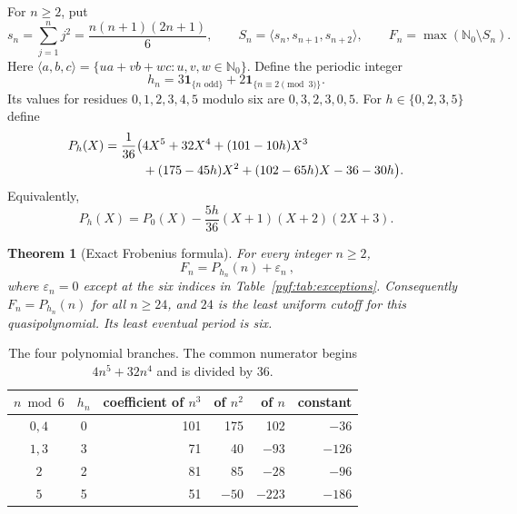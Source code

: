 \documentclass[11pt,a4paper]{article}
\numberwithin{equation}{section}
\newtheorem{theorem}{Theorem}[section]
\theoremstyle{definition}
\newcommand{\N}{\mathbb N_0}
\newcommand{\eps}{\varepsilon}
\newcommand{\ind}{\mathbf 1}
\begin{document}
For $n\geq2$, put
\begin{equation}\label{pyf:eq:defs}
s_n=\sum_{j=1}^n j^2=\frac{n(n+1)(2n+1)}6,
\qquad S_n=\langle s_n,s_{n+1},s_{n+2}\rangle,
\qquad F_n=\max(\N\setminus S_n).
\end{equation}
Here $\langle a,b,c\rangle=\{ua+vb+wc:u,v,w\in\N\}$.
Define the periodic integer
\begin{equation}\label{pyf:eq:h}
h_n=3\ind_{\{n\text{ odd}\}}+2\ind_{\{n\equiv2\pmod3\}}.
\end{equation}
Its values for residues $0,1,2,3,4,5$ modulo six are
$0,3,2,3,0,5$.
For $h\in\{0,2,3,5\}$ define
\begin{align}\label{pyf:eq:Ph}
P_h(X)=\frac1{36}\bigl(&4X^5+32X^4+(101-10h)X^3\notag\\
 &+(175-45h)X^2+(102-65h)X-36-30h\bigr).
\end{align}
Equivalently,
\begin{equation}\label{pyf:eq:compactP}
P_h(X)=P_0(X)-\frac{5h}{36}(X+1)(X+2)(2X+3).
\end{equation}

\begin{samepage}
\begin{theorem}[Exact Frobenius formula]\label{pyf:thm:main}
For every integer $n\geq2$,
\begin{equation}\label{pyf:eq:F}
\boxed{\ F_n=P_{h_n}(n)+\eps_n\ },
\end{equation}
where $\eps_n=0$ except at the six indices in Table~\ref{pyf:tab:exceptions}.
Consequently $F_n=P_{h_n}(n)$ for all $n\geq24$, and $24$ is the least
uniform cutoff for this quasipolynomial. Its least eventual period is six.
\end{theorem}
\end{samepage}

\begin{table}[ht]
\centering
\caption{The four polynomial branches. The common numerator begins
$4n^5+32n^4$ and is divided by $36$.}\label{pyf:tab:branches}
\begin{tabular}{ccrrrr}
\toprule
$n\bmod6$ & $h_n$ & coefficient of $n^3$ & of $n^2$ & of $n$ & constant\\
\midrule
$0,4$ & 0 & 101 & 175 & 102 & $-36$\\
$1,3$ & 3 & 71 & 40 & $-93$ & $-126$\\
$2$   & 2 & 81 & 85 & $-28$ & $-96$\\
$5$   & 5 & 51 & $-50$ & $-223$ & $-186$\\
\bottomrule
\end{tabular}
\end{table}
\end{document}
